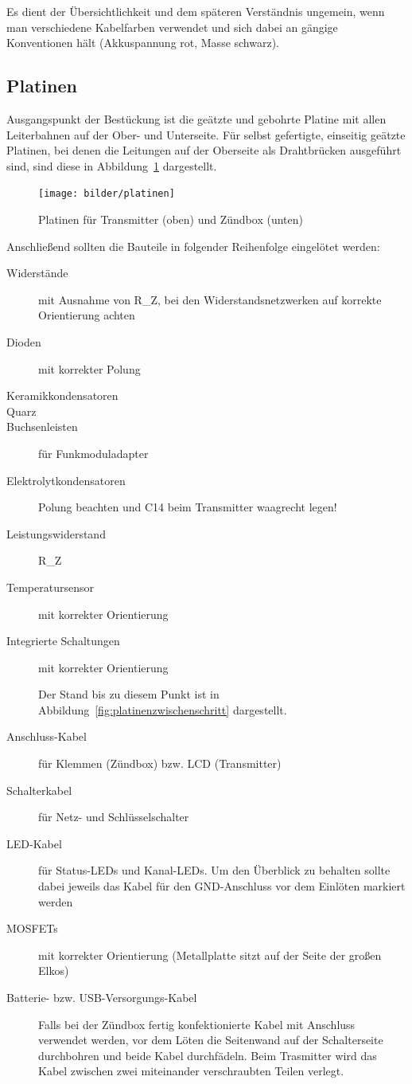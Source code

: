 \documentclass[paper=a4, parskip, numbers=noenddot, toc=listof, headsepline]{scrbook}
\begin{document}
				Es dient der Übersichtlichkeit und dem späteren Verständnis ungemein, wenn man verschiedene Kabelfarben verwendet und sich dabei an gängige Konventionen hält (Akkuspannung rot, Masse schwarz).

			\subsection{Platinen}

				Ausgangspunkt der Bestückung ist die geätzte und gebohrte Platine mit allen Leiterbahnen auf der Ober- und Unterseite. Für selbst gefertigte, einseitig geätzte Platinen, bei denen die Leitungen auf der Oberseite als Drahtbrücken ausgeführt sind, sind diese in Abbildung~\ref{fig:platinen} dargestellt.

				\begin{figure}[t]
					\centering
					\texttt{[image: bilder/platinen]}
					\caption{Platinen für Transmitter (oben) und Zündbox (unten)}
					\label{fig:platinen}
				\end{figure}

				Anschließend sollten die Bauteile in folgender Reihenfolge eingelötet werden:
				\begin{description}
					\item[Widerstände] mit Ausnahme von R\_Z, bei den Widerstandsnetzwerken auf korrekte Orientierung achten
					\item[Dioden] mit korrekter Polung
					\item[Keramikkondensatoren]
					\item[Quarz]
					\item[Buchsenleisten] für Funkmoduladapter
					\item[Elektrolytkondensatoren] Polung beachten und C14 beim Transmitter waagrecht legen!
					\item[Leistungswiderstand] R\_Z
					\item[Temperatursensor] mit korrekter Orientierung
					\item[Integrierte Schaltungen] mit korrekter Orientierung
					      \begin{center}
						      Der Stand bis zu diesem Punkt ist in Abbildung~\ref{fig:platinenzwischenschritt} dargestellt.
					      \end{center}
					\item[Anschluss-Kabel] für Klemmen (Zündbox) bzw. LCD (Transmitter)
					\item[Schalterkabel] für Netz- und Schlüsselschalter
					\item[LED-Kabel] für Status-LEDs und Kanal-LEDs. Um den Überblick zu behalten sollte dabei jeweils das Kabel für den GND-Anschluss vor dem Einlöten markiert werden
					\item[MOSFETs] mit korrekter Orientierung (Metallplatte sitzt auf der Seite der großen Elkos)
					\item[Batterie- bzw. USB-Versorgungs-Kabel] Falls bei der Zündbox fertig konfektionierte Kabel mit Anschluss verwendet werden, vor dem Löten die Seitenwand auf der Schalterseite durchbohren und beide Kabel durchfädeln. Beim Trasmitter wird das Kabel zwischen zwei miteinander verschraubten Teilen verlegt.
				\end{description}
\end{document}
